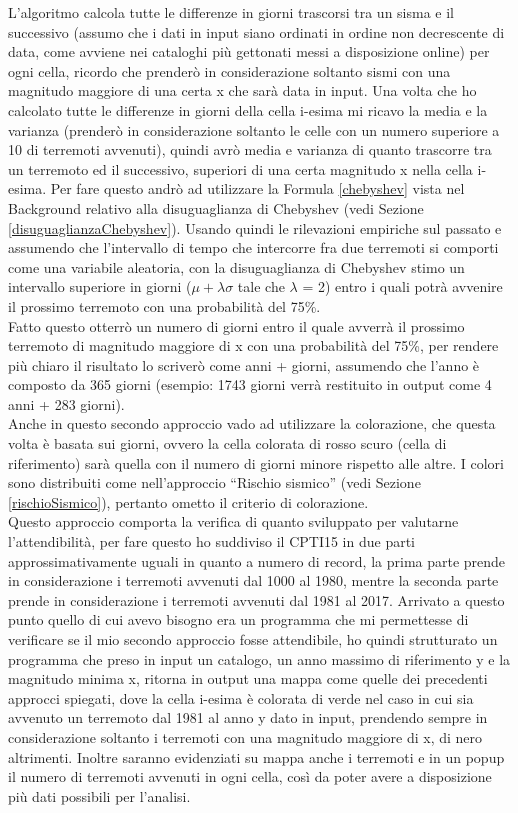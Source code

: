 L'algoritmo calcola tutte le differenze in giorni trascorsi tra un sisma e il successivo (assumo che i dati in input siano ordinati in ordine non decrescente di data, come avviene nei cataloghi pi\`u gettonati messi a disposizione online) per ogni cella, ricordo che prender\`o in considerazione soltanto sismi con una magnitudo maggiore di una certa x che sar\`a data in input. Una volta che ho calcolato tutte le differenze in giorni della cella i-esima mi ricavo la media e la varianza (prender\`o in considerazione soltanto le celle con un numero superiore a 10 di terremoti avvenuti), quindi avr\`o media e varianza di quanto trascorre tra un terremoto ed il successivo, superiori di una certa magnitudo x nella cella i-esima. Per fare questo andr\`o ad utilizzare la Formula \ref{chebyshev} vista nel Background relativo alla disuguaglianza di Chebyshev (vedi Sezione \ref{disuguaglianzaChebyshev}).
Usando quindi le rilevazioni empiriche sul passato e assumendo che l'intervallo di tempo che intercorre fra due terremoti si comporti come una variabile aleatoria, con la disuguaglianza di Chebyshev stimo un intervallo superiore in giorni ($\mu + \lambda\sigma$ tale che $\lambda$ = 2) entro i quali potr\`a avvenire il prossimo terremoto con una probabilit\`a del 75\%.\\
Fatto questo otterr\`o un numero di giorni entro il quale avverr\`a il prossimo terremoto di magnitudo maggiore di x con una probabilit\`a del 75\%, per rendere pi\`u chiaro il risultato lo scriver\`o come anni + giorni, assumendo che l'anno \`e composto da 365 giorni (esempio: 1743 giorni verr\`a restituito in output come 4 anni + 283 giorni).\\
Anche in questo secondo approccio vado ad utilizzare la colorazione, che questa volta \`e basata sui giorni, ovvero la cella colorata di rosso scuro (cella di riferimento) sar\`a quella con il numero di giorni minore rispetto alle altre. I colori sono distribuiti come nell'approccio ``Rischio sismico'' (vedi Sezione \ref{rischioSismico}), pertanto ometto il criterio di colorazione.\\
Questo approccio comporta la verifica di quanto sviluppato per valutarne l'attendibilit\`a, per fare questo ho suddiviso il CPTI15 in due parti approssimativamente uguali in quanto a numero di record, la prima parte prende in considerazione i terremoti avvenuti dal 1000 al 1980, mentre la seconda parte prende in considerazione i terremoti avvenuti dal 1981 al 2017. Arrivato a questo punto quello di cui avevo bisogno era un programma che mi permettesse di verificare se il mio secondo approccio fosse attendibile, ho quindi strutturato un programma che preso in input un catalogo, un anno massimo di riferimento y e la magnitudo minima x, ritorna in output una mappa come quelle dei precedenti approcci spiegati, dove la cella i-esima \`e colorata di verde nel caso in cui sia avvenuto un terremoto dal 1981 al anno y dato in input, prendendo sempre in considerazione soltanto i terremoti con una magnitudo maggiore di x, di nero altrimenti. Inoltre saranno evidenziati su mappa anche i terremoti e in un popup il numero di terremoti avvenuti in ogni cella, cos\`i da poter avere a disposizione pi\`u dati possibili per l'analisi.

